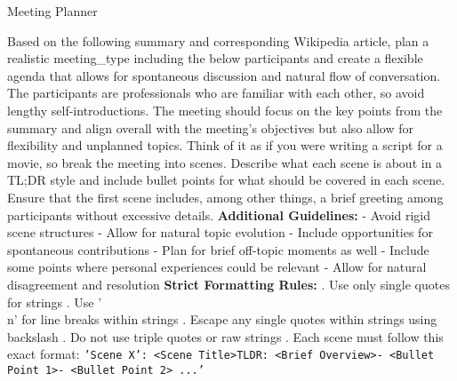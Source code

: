 \begin{figure*}[t]
    \begin{AIbox}{Meeting Planner}
    \parbox[t]{\textwidth}{
        Based on the following summary and corresponding Wikipedia article, plan a realistic {meeting\_type} including the below participants and create a flexible agenda that allows for spontaneous discussion and natural flow of conversation. The participants are professionals who are familiar with each other, so avoid lengthy self-introductions. The meeting should focus on the key points from the summary and align overall with the meeting's objectives but also allow for flexibility and unplanned topics. \newline
        Think of it as if you were writing a script for a movie, so break the meeting into scenes. Describe what each scene is about in a TL;DR style and include bullet points for what should be covered in each scene. \newline
        Ensure that the first scene includes, among other things, a brief greeting among participants without excessive details. \newline
        \textbf{Additional Guidelines:} \newline
        - Avoid rigid scene structures \newline
        - Allow for natural topic evolution \newline
        - Include opportunities for spontaneous contributions \newline
        - Plan for brief off-topic moments as well \newline
        - Include some points where personal experiences could be relevant \newline
        - Allow for natural disagreement and resolution \newline
        \textbf{Strict Formatting Rules:} . Use only single quotes for strings . Use '\\n' for line breaks within strings . Escape any single quotes within strings using backslash . Do not use triple quotes or raw strings . Each scene must follow this exact format: \newline
        \quad \texttt{'Scene X': <Scene Title>\newline TLDR: <Brief Overview>\newline- <Bullet Point 1>\newline- <Bullet Point 2> ...'} \newline
}
\end{AIbox}
\end{figure*}
